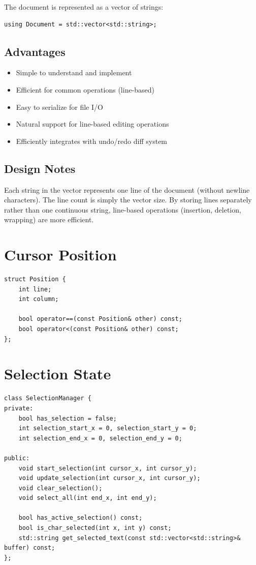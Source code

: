 \documentclass[12pt,a4paper,oneside,openany]{report}
\begin{document}
The document is represented as a vector of strings:

\begin{lstlisting}
using Document = std::vector<std::string>;
\end{lstlisting}

\subsection{Advantages}

\begin{itemize}
	\item Simple to understand and implement
	\item Efficient for common operations (line-based)
	\item Easy to serialize for file I/O
	\item Natural support for line-based editing operations
	\item Efficiently integrates with undo/redo diff system
\end{itemize}

\subsection{Design Notes}

Each string in the vector represents one line of the document (without newline characters). The line count is simply the vector size. By storing lines separately rather than one continuous string, line-based operations (insertion, deletion, wrapping) are more efficient.

\section{Cursor Position}

\begin{lstlisting}
struct Position {
    int line;
    int column;
    
    bool operator==(const Position& other) const;
    bool operator<(const Position& other) const;
};
\end{lstlisting}

\section{Selection State}

\begin{lstlisting}
class SelectionManager {
private:
    bool has_selection = false;
    int selection_start_x = 0, selection_start_y = 0;
    int selection_end_x = 0, selection_end_y = 0;
    
public:
    void start_selection(int cursor_x, int cursor_y);
    void update_selection(int cursor_x, int cursor_y);
    void clear_selection();
    void select_all(int end_x, int end_y);
    
    bool has_active_selection() const;
    bool is_char_selected(int x, int y) const;
    std::string get_selected_text(const std::vector<std::string>& buffer) const;
};
\end{lstlisting}
\end{document}
